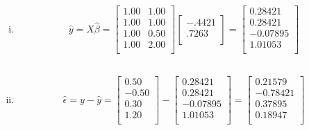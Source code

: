 \documentclass{article}
\begin{document}
\begin{flushleft}
\begin{enumerate}[(i)]
\item
\begin{multline*}\\
\hat{y}=X\hat{\beta}=\left[
\begin{array}{rr}
1.00 & 1.00 \\ 
1.00 & 1.00 \\ 
1.00 & 0.50 \\ 
1.00 & 2.00 \\ 
\end{array}
\right]\left[
\begin{array}{r}
-.4421 \\ 
.7263 \\ 
\end{array}\right]=\left[
\begin{array}{r}
0.28421 \\ 
0.28421 \\ 
-0.07895 \\ 
1.01053 \\ 
\end{array}
\right]\\
\end{multline*}

\item
\begin{multline*}\\
\hat{\epsilon}=y-\hat{y}=\left[
\begin{array}{r}
0.50 \\ 
-0.50 \\ 
0.30 \\ 
1.20 \\ 
\end{array}
\right]-\left[
\begin{array}{r}
0.28421 \\ 
0.28421 \\ 
-0.07895 \\ 
1.01053 \\ 
\end{array}
\right]=\left[
\begin{array}{r}
0.21579 \\ 
-0.78421 \\ 
0.37895 \\ 
0.18947 \\ 
\end{array}
\right]\\
\end{multline*}

\end{enumerate}
	

\end{flushleft}
\end{document}
